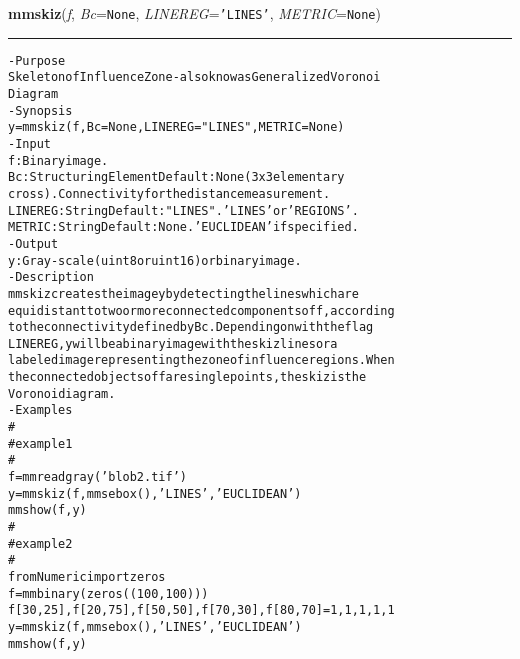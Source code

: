     \begin{boxedminipage}{\textwidth}

    \raggedright \textbf{mmskiz}(\textit{f}, \textit{Bc}=\texttt{N\-o\-n\-e\-}, \textit{LINEREG}=\texttt{'\-L\-I\-N\-E\-S\-'\-}, \textit{METRIC}=\texttt{N\-o\-n\-e\-})

    \vspace{-1.5ex}

    \rule{\textwidth}{0.5\fboxrule}
\begin{alltt}
- Purpose
    Skeleton of Influence Zone - also know as Generalized Voronoi
    Diagram
- Synopsis
    y = mmskiz(f, Bc=None, LINEREG="LINES", METRIC=None)
- Input
    f:       Binary image.
    Bc:      Structuring Element Default: None (3x3 elementary
             cross). Connectivity for the distance measurement.
    LINEREG: String Default: "LINES". 'LINES' or 'REGIONS'.
    METRIC:  String Default: None. 'EUCLIDEAN' if specified.
- Output
    y: Gray-scale (uint8 or uint16) or binary image.
- Description
    mmskiz creates the image y by detecting the lines which are
    equidistant to two or more connected components of f , according
    to the connectivity defined by Bc . Depending on with the flag
    LINEREG, y will be a binary image with the skiz lines or a
    labeled image representing the zone of influence regions. When
    the connected objects of f are single points, the skiz is the
    Voronoi diagram.
- Examples
    \#
    \#   example 1
    \#
    f=mmreadgray('blob2.tif')
    y=mmskiz(f,mmsebox(),'LINES','EUCLIDEAN')
    mmshow(f,y)
    \#
    \#   example 2
    \#
    from Numeric import zeros
    f=mmbinary(zeros((100,100)))
    f[30,25],f[20,75],f[50,50],f[70,30],f[80,70] = 1,1,1,1,1
    y = mmskiz(f,mmsebox(),'LINES','EUCLIDEAN')
    mmshow(f,y)\end{alltt}

    \vspace{1ex}

    \end{boxedminipage}

    \label{multireg:num_pymorph:mmstats}
    \vspace{0.5ex}

